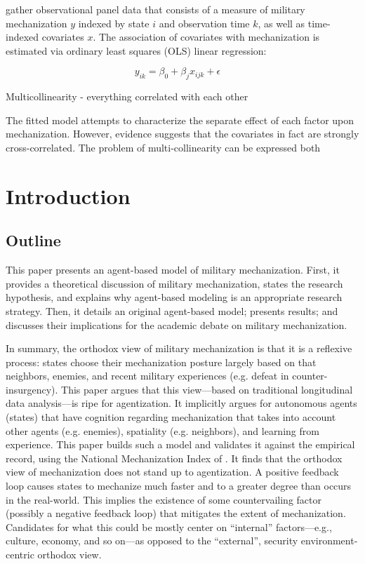 \documentclass{article}
\begin{document}
\citet{sechser2010army} gather observational panel data that consists of a measure 
of military mechanization $y$ indexed by state $i$ and observation time $k$, as well as
time-indexed covariates $x$. The association of covariates with mechanization is
estimated via ordinary least squares (OLS) linear regression:

\begin{equation}
	y_{ik} = \beta_0 + \beta_j x_{ijk} + \epsilon \hspace{1em}
\end{equation}

Multicollinearity - everything correlated with each other

The fitted model attempts to characterize the separate
effect of each factor upon mechanization. However, evidence suggests that
the covariates in fact are strongly cross-correlated. The problem of
multi-collinearity can be expressed both 

\section{Introduction}

\subsection{Outline}


This paper presents an agent-based model of military mechanization. First, it
provides a theoretical discussion of military mechanization, states the research
hypothesis, and explains why agent-based modeling is an appropriate research strategy.
Then, it details an original agent-based model; presents results; and discusses
their implications for the academic debate on military mechanization.

In summary, the orthodox view of military mechanization is that it is a
reflexive process: states choose their mechanization posture largely based on
that neighbors, enemies, and recent military experiences (e.g. defeat in
counter-insurgency). This paper argues
that this view---based on traditional longitudinal data analysis---is ripe for
agentization. It implicitly argues for autonomous agents (states) that have
cognition regarding mechanization that takes into account other agents (e.g.
enemies), spatiality (e.g. neighbors), and learning from experience. This paper
builds such a model and validates it against the empirical record, using the
National Mechanization Index of \citet{sechser2010army}. It finds that the 
orthodox view of mechanization does not stand up to agentization. A positive feedback loop 
causes states to
mechanize much faster and to a greater degree than occurs in the real-world.
This implies the existence of some countervailing factor (possibly a negative
feedback loop) that mitigates the extent of mechanization. Candidates for what
this could be mostly center on ``internal'' factors---e.g., culture, economy,
and so on---as opposed to the ``external'', security environment-centric
orthodox view.
\end{document}
